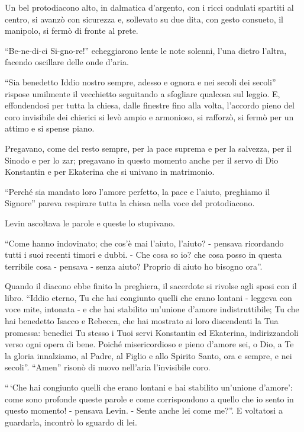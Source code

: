 Un bel protodiacono alto, in dalmatica d'argento, con i ricci ondulati spartiti al centro, si avanzò con sicurezza e, sollevato su due dita, con gesto consueto, il manipolo, si fermò di fronte al prete. 

``Be-ne-di-ci Si-gno-re!'' echeggiarono lente le note solenni, l'una dietro l'altra, facendo oscillare delle onde d'aria. 

``Sia benedetto Iddio nostro sempre, adesso e ognora e nei secoli dei secoli'' rispose umilmente il vecchietto seguitando a sfogliare qualcosa sul leggio. E, effondendosi per tutta la chiesa, dalle finestre fino alla volta, l'accordo pieno del coro invisibile dei chierici si levò ampio e armonioso, si rafforzò, si fermò per un attimo e si spense piano. 

Pregavano, come del resto sempre, per la pace suprema e per la salvezza, per il Sinodo e per lo zar; pregavano in questo momento anche per il servo di Dio Konstantin e per Ekaterina che si univano in matrimonio. 

``Perché sia mandato loro l'amore perfetto, la pace e l'aiuto, preghiamo il Signore'' pareva respirare tutta la chiesa nella voce del protodiacono. 

Levin ascoltava le parole e queste lo stupivano. 

``Come hanno indovinato; che cos'è mai l'aiuto, l'aiuto? - pensava ricordando tutti i suoi recenti timori e dubbi. - Che cosa so io? che cosa posso in questa terribile cosa - pensava - senza aiuto? Proprio di aiuto ho bisogno ora''. 

Quando il diacono ebbe finito la preghiera, il sacerdote si rivolse agli sposi con il libro. ``Iddio eterno, Tu che hai congiunto quelli che erano lontani - leggeva con voce mite, intonata - e che hai stabilito un'unione d'amore indistruttibile; Tu che hai benedetto Isacco e Rebecca, che hai mostrato ai loro discendenti la Tua promessa: benedici Tu stesso i Tuoi servi Konstantin ed Ekaterina, indirizzandoli verso ogni opera di bene. Poiché misericordioso e pieno d'amore sei, o Dio, a Te la gloria innalziamo, al Padre, al Figlio e allo Spirito Santo, ora e sempre, e nei secoli''. ``Amen'' risonò di nuovo nell'aria l'invisibile coro. 

``\,`Che hai congiunto quelli che erano lontani e hai stabilito un'unione d'amore': come sono profonde queste parole e come corrispondono a quello che io sento in questo momento! - pensava Levin. - Sente anche lei come me?''. E voltatosi a guardarla, incontrò lo sguardo di lei. 

